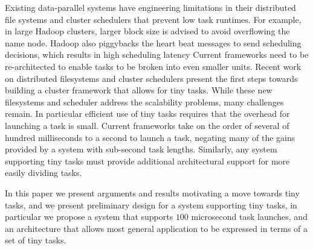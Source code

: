 Existing data-parallel systems have engineering limitations in their distributed
file systems and cluster schedulers that prevent low task runtimes. For example, in
large Hadoop clusters, larger block size is advised to avoid overflowing the name node.
Hadoop also piggybacks the heart beat messages to send scheduling decisions, which
results in high scheduling latency
Current frameworks need to be re-architected to enable tasks to be broken into even smaller
units. 
Recent work on distributed filesystems\cite{nightingale2012flat} and cluster
schedulers\cite{ousterhoutbatch} present the first steps towards
building a cluster framework that allows for tiny tasks. While these new filesystems
and scheduler address the scalability problems, many challenges remain. In particular
efficient use of tiny tasks requires that the overhead for launching a task is small. Current
frameworks take on the order of several of hundred milliseconds to a second to launch a task, negating
many of the gains provided by a system with sub-second task lengths. Similarly, any system
supporting tiny tasks must provide additional architectural support for more easily dividing tasks.

In this paper we present arguments and results motivating a move towards tiny tasks,
and we present preliminary design for a system supporting tiny tasks, in particular
we propose a system that supports $100$ microsecond task launches, and an architecture
that allows most general application to be expressed in terms of a set of tiny tasks.

